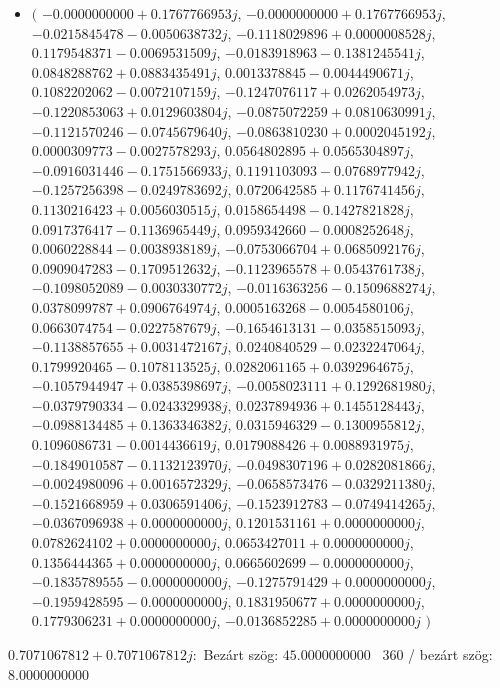 \documentclass[14pt,a4paper]{article}
\begin{document}
\begin{itemize}
\item
$\big($
$-0.0000000000+0.1767766953j$, $-0.0000000000+0.1767766953j$, $-0.0215845478-0.0050638732j$, $-0.1118029896+0.0000008528j$, $0.1179548371-0.0069531509j$, $-0.0183918963-0.1381245541j$, $0.0848288762+0.0883435491j$, $0.0013378845-0.0044490671j$, $0.1082202062-0.0072107159j$, $-0.1247076117+0.0262054973j$, $-0.1220853063+0.0129603804j$, $-0.0875072259+0.0810630991j$, $-0.1121570246-0.0745679640j$, $-0.0863810230+0.0002045192j$, $0.0000309773-0.0027578293j$, $0.0564802895+0.0565304897j$, $-0.0916031446-0.1751566933j$, $0.1191103093-0.0768977942j$, $-0.1257256398-0.0249783692j$, $0.0720642585+0.1176741456j$, $0.1130216423+0.0056030515j$, $0.0158654498-0.1427821828j$, $0.0917376417-0.1136965449j$, $0.0959342660-0.0008252648j$, $0.0060228844-0.0038938189j$, $-0.0753066704+0.0685092176j$, $0.0909047283-0.1709512632j$, $-0.1123965578+0.0543761738j$, $-0.1098052089-0.0030330772j$, $-0.0116363256-0.1509688274j$, $0.0378099787+0.0906764974j$, $0.0005163268-0.0054580106j$, $0.0663074754-0.0227587679j$, $-0.1654613131-0.0358515093j$, $-0.1138857655+0.0031472167j$, $0.0240840529-0.0232247064j$, $0.1799920465-0.1078113525j$, $0.0282061165+0.0392964675j$, $-0.1057944947+0.0385398697j$, $-0.0058023111+0.1292681980j$, $-0.0379790334-0.0243329938j$, $0.0237894936+0.1455128443j$, $-0.0988134485+0.1363346382j$, $0.0315946329-0.1300955812j$, $0.1096086731-0.0014436619j$, $0.0179088426+0.0088931975j$, $-0.1849010587-0.1132123970j$, $-0.0498307196+0.0282081866j$, $-0.0024980096+0.0016572329j$, $-0.0658573476-0.0329211380j$, $-0.1521668959+0.0306591406j$, $-0.1523912783-0.0749414265j$, $-0.0367096938+0.0000000000j$, $0.1201531161+0.0000000000j$, $0.0782624102+0.0000000000j$, $0.0653427011+0.0000000000j$, $0.1356444365+0.0000000000j$, $0.0665602699-0.0000000000j$, $-0.1835789555-0.0000000000j$, $-0.1275791429+0.0000000000j$, $-0.1959428595-0.0000000000j$, $0.1831950677+0.0000000000j$, $0.1779306231+0.0000000000j$, $-0.0136852285+0.0000000000j$
$\big)$
\end{itemize}
$0.7071067812+0.7071067812j$:\
Bezárt szög: $45.0000000000$ \
360 / bezárt szög: $8.0000000000$\
\end{document}
